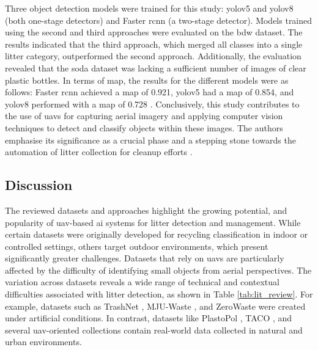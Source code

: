Three object detection models were trained for this study: \gls{yolo}v5 and \gls{yolo}v8 (both one-stage detectors) and Faster \gls{rcnn} (a two-stage detector). Models trained using the second and third approaches were evaluated on the \gls{bdw} dataset. The results indicated that the third approach, which merged all classes into a single litter category, outperformed the second approach. Additionally, the evaluation revealed that the \gls{soda} dataset was lacking a sufficient number of images of clear plastic bottles. 
In terms of \gls{map}, the results for the different models were as follows: Faster \gls{rcnn} achieved a \gls{map} of 0.921, \gls{yolo}v5 had a \gls{map} of 0.854, and \gls{yolo}v8 performed with a \gls{map} of 0.728 \cite{soda_dataset, detect_litter}. 
Conclusively, this study contributes to the use of \glspl{uav} for capturing aerial imagery and applying computer vision techniques to detect and classify objects within these images. The authors emphasise its significance as a crucial phase and a stepping stone towards the automation of litter collection for cleanup efforts \cite{detect_litter, soda_dataset, daniel_thesis}.

\subsection{Discussion}
\label{subsec:3_discussion}

The reviewed datasets and approaches highlight the growing potential, and popularity of \gls{uav}-based \gls{ai} systems for litter detection and management. While certain datasets were originally developed for recycling classification in indoor or controlled settings, others target outdoor environments, which present significantly greater challenges. Datasets that rely on \glspl{uav} are particularly affected by the difficulty of identifying small objects from aerial perspectives.
The variation across datasets reveals a wide range of technical and contextual difficulties associated with litter detection, as shown in Table \ref{tab:lit_review}. For example, datasets such as TrashNet \cite{trashnet}, MJU-Waste \cite{mju_waste}, and ZeroWaste \cite{zerowaste} were created under artificial conditions. In contrast, datasets like PlastoPol \cite{plastopol}, TACO \cite{taco2020}, and several \gls{uav}-oriented collections \cite{haida,soda_dataset,uavvaste,bdwdataset,beach_litter,superdock,umgeosurvey} contain real-world data collected in natural and urban environments.


